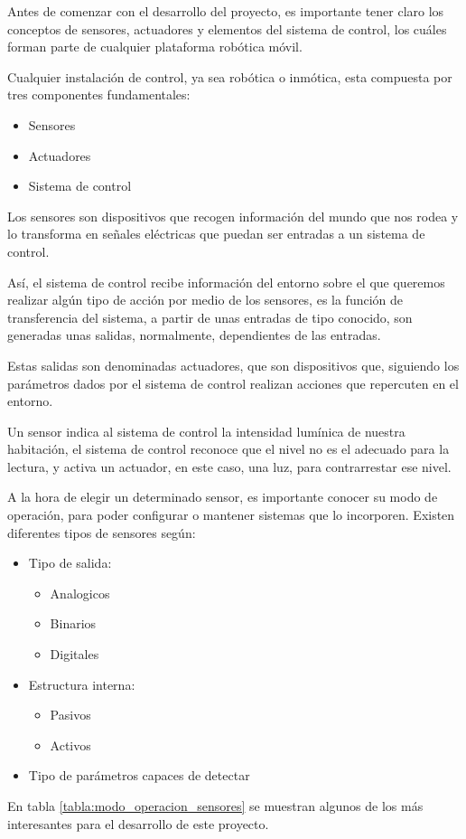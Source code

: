 Antes de comenzar con el desarrollo del proyecto, es importante tener claro los conceptos de sensores, actuadores y elementos del sistema de control, los cuáles forman parte de cualquier plataforma robótica móvil. \newline

Cualquier instalación de control, ya sea robótica o inmótica, esta compuesta por tres componentes fundamentales:
\begin{itemize}
	\item Sensores
	\item Actuadores
	\item Sistema de control
\end{itemize}

Los sensores son dispositivos que recogen información del mundo que nos rodea y lo transforma en señales eléctricas que puedan ser entradas a un sistema de control. \newline

Así, el sistema de control recibe información del entorno sobre el que queremos realizar algún tipo de acción por medio de los sensores, es la función de transferencia del sistema, a partir de unas entradas de tipo conocido, son generadas unas salidas, normalmente, dependientes de las entradas. \newline

Estas salidas son denominadas actuadores, que son dispositivos que, siguiendo los parámetros dados por el sistema de control realizan acciones que repercuten en el entorno. \newline

\begin{ejemplo}
Un sensor indica al sistema de control la intensidad lumínica de nuestra habitación, el sistema de control reconoce que el nivel no es el adecuado para la lectura, y activa un actuador, en este caso, una luz, para contrarrestar ese nivel.
\end{ejemplo}

A la hora de elegir un determinado sensor, es importante conocer su modo de operación, para poder configurar o mantener sistemas que lo incorporen. Existen diferentes tipos de sensores según:

\begin{itemize}
	\item Tipo de salida: \begin{itemize}
		\item Analogicos
		\item Binarios
		\item Digitales
	\end{itemize} 
	
	\item Estructura interna: \begin{itemize}
		\item Pasivos
		\item Activos
	\end{itemize}
	
	\item Tipo de parámetros capaces de detectar
\end{itemize}
 En tabla \ref{tabla:modo_operacion_sensores} se muestran algunos de los más interesantes para el desarrollo de este proyecto.

